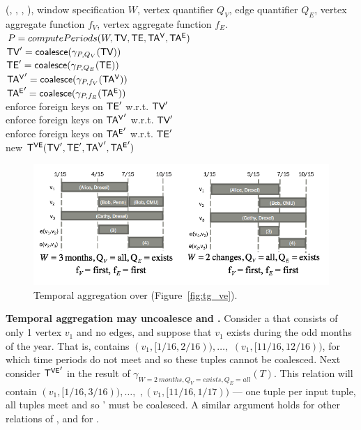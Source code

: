 \begin{algorithm}[h!]
\caption{Temporal aggregation in \tve.}
\begin{algorithmic}[1]
\REQUIRE \tve (\tv, \te, \tav, \tae), window specification $W$, vertex
quantifier $Q_V$, edge quantifier $Q_E$, vertex aggregate function
$f_V$, vertex aggregate function $f_E$.\\
\STATE $P = computePeriods(W, \textsf{TV}, \textsf{TE}, \mathsf{TA^{V}}, \mathsf{TA^{E}})$\\
\STATE  $\textsf{TV}' = \textsf{coalesce} (\gamma_{P,Q_V}(\textsf{TV}))$\\
\STATE  $\textsf{TE}' = \textsf{coalesce} (\gamma_{P,Q_E}(\textsf{TE}))$\\
\STATE  $\mathsf{TA^{V}}' = \textsf{coalesce} (\gamma_{P,f_V}(\mathsf{TA^{V}}))$\\
\STATE  $\mathsf{TA^{E}}' = \textsf{coalesce} (\gamma_{P,f_E}(\mathsf{TA^{E}}))$\\
\STATE  enforce foreign keys on $\textsf{TE}'$ w.r.t. $\textsf{TV}'$\\
\STATE  enforce foreign keys on $\mathsf{TA^{V}}'$ w.r.t. $\textsf{TV}'$\\
\STATE  enforce foreign keys on $\mathsf{TA^{E}}'$ w.r.t. $\textsf{TE}'$\\
\RETURN new $\mathsf{T^{VE}} (\textsf{TV}', \textsf{TE}', \mathsf{TA^{V}}', \mathsf{TA^{E}}')$\\
\end{algorithmic}
\label{alg:agg_ve}
\end{algorithm}

\begin{figure}
\includegraphics[width=5in]{figs/agg.png}
\caption{Temporal aggregation over  (Figure~\ref{fig:tg_ve}). }
\label{fig:tg_agg}
\end{figure}

{\bf Temporal aggregation may uncoalesce \tve and \trg.} Consider a
\tg {} that consists of only 1 vertex $v_1$ and no edges, and
suppose that $v_1$ exists during the odd months of the year.  That is,
\tv contains $(v_1, [1/16, 2/16)), \ldots,$ $(v_1, [11/16,12/16))$,
    for which time periods do not meet and so these tuples cannot be
    coalesced.  Next consider $\mathsf{T^{VE}}'$ in the result of
    $\gamma_{W=2~months, Q_V=exists,Q_E=all}(T)$.  This relation will
    contain $(v_1, [1/16, 3/16)), \ldots,$ $,(v_1, [11/16,1/17))$ ---
        one tuple per input tuple, all tuples meet and so \tv' must be
        coalesced.  A similar argument holds for other relations of
        \tve, and for \trg.

